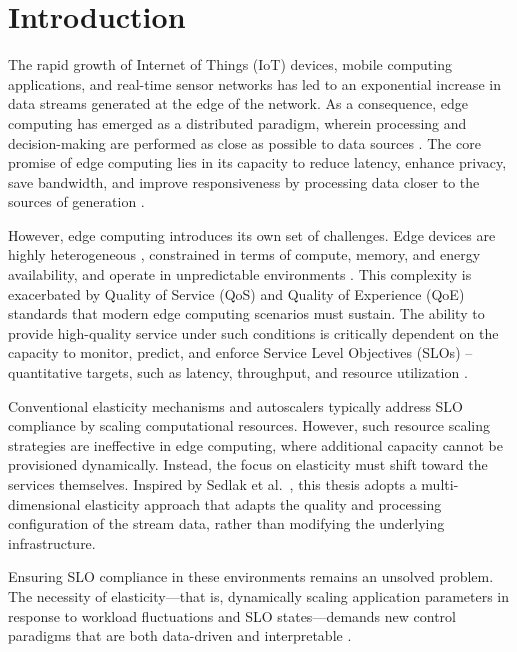 \chapter{Introduction}

The rapid growth of Internet of Things (IoT) devices, mobile computing applications, and real-time sensor networks has led to an exponential increase in data streams generated at the edge of the network. As a consequence, edge computing has emerged as a distributed paradigm, wherein processing and decision-making are performed as close as possible to data sources \cite{deng_edge_2020}. The core promise of edge computing lies in its capacity to
reduce latency, enhance privacy, save bandwidth, and improve responsiveness by processing data closer to the sources of generation \cite{deng_edge_2020}. 

However, edge computing introduces its own set of challenges. Edge devices are highly heterogeneous \cite{furst_elastic_2018}, constrained in terms of compute, memory, and energy availability, and operate in unpredictable environments \cite{sedlak_active_2024, danilenka_adaptive_2025}. This complexity is exacerbated by Quality of Service (QoS) and Quality of Experience (QoE) standards that modern edge computing scenarios must sustain. The ability to provide high-quality service under such conditions is critically dependent on the capacity to monitor, predict, and enforce Service Level Objectives (SLOs) --quantitative targets, such as latency, throughput, and resource utilization \cite{sedlak_diffusing_2024, nastic_sloc_2020}. 

Conventional elasticity mechanisms and autoscalers typically address SLO compliance by scaling computational resources. However, such resource scaling strategies are ineffective in edge computing, where additional capacity cannot be provisioned dynamically. Instead, the focus on elasticity must shift toward the services themselves. Inspired by Sedlak et al.~\cite{sedlak_towards_2025}, this thesis adopts a multi-dimensional elasticity approach that adapts the quality and processing configuration of the stream data, rather than modifying the underlying infrastructure.

Ensuring SLO compliance in these environments remains an unsolved problem. The necessity of elasticity—that is, dynamically scaling application parameters in response to workload fluctuations and SLO states—demands new control paradigms that are both data-driven and interpretable \cite{lapkovskis_benchmarking_2025, dias_de_assuncao_distributed_2018}.

